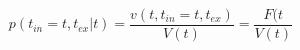 \begin{equation}
p(t_{in}=t,t_{ex}|t)  = \frac{v(t,t_{in}=t,t_{ex})}{V(t)}= \frac{F(t}{V(t)}
\end{equation}\begin{equation}

\end{equation}
